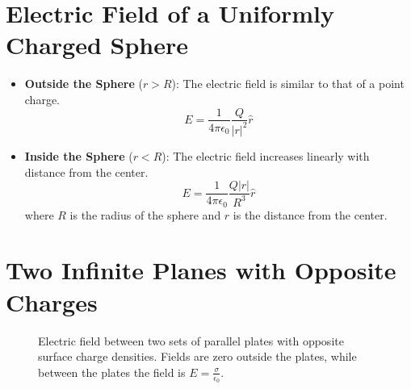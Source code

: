 \documentclass{article}
\begin{document}
\section*{Electric Field of a Uniformly Charged Sphere}
\begin{itemize}
    \item \textbf{Outside the Sphere} (\(r > R\)): The electric field is similar to that of a point charge.
    \[
    E = \frac{1}{4\pi\epsilon_0} \frac{Q}{|r|^2} \hat{r}
    \]
    \item \textbf{Inside the Sphere} (\(r < R\)): The electric field increases linearly with distance from the center.
    \[
    E = \frac{1}{4\pi\epsilon_0} \frac{Q|r|}{R^3} \hat{r}
    \]
    where \(R\) is the radius of the sphere and \(r\) is the distance from the center.
\end{itemize}

\section*{Two Infinite Planes with Opposite Charges}

\begin{figure}[h!]
    \centering
    \caption{Electric field between two sets of parallel plates with opposite surface charge densities. Fields are zero outside the plates, while between the plates the field is \( E = \frac{\sigma}{\epsilon_0} \).}
    \label{fig:parallel_plates_field}
\end{figure}
\end{document}
